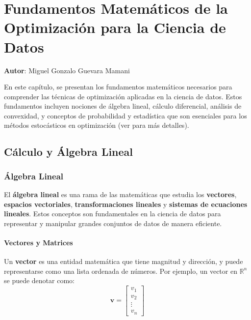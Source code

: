 \documentclass[12pt,a4,oneside]{book}
\begin{document}
	
	\chapter{Fundamentos Matemáticos de la Optimización para la Ciencia de Datos}
	\textbf{Autor}: \large{Miguel Gonzalo Guevara Mamani}
	\label{chap:1}
	
	\vspace{1em}
	
	En este capítulo, se presentan los fundamentos matemáticos necesarios para comprender las técnicas de optimización aplicadas en la ciencia de datos. Estos fundamentos incluyen nociones de álgebra lineal, cálculo diferencial, análisis de convexidad, y conceptos de probabilidad y estadística que son esenciales para los métodos estocásticos en optimización (ver \cite{kirkland2021, garcia2022, smith2023, williams2024} para más detalles).
	
	\section{Cálculo y Álgebra Lineal}
	
	\subsection{Álgebra Lineal}
	
	El \textbf{álgebra lineal} es una rama de las matemáticas que estudia los \textbf{vectores}, \textbf{espacios vectoriales}, \textbf{transformaciones lineales} y \textbf{sistemas de ecuaciones lineales}. Estos conceptos son fundamentales en la ciencia de datos para representar y manipular grandes conjuntos de datos de manera eficiente.
	
	\subsubsection{Vectores y Matrices}
	
	Un \textbf{vector} es una entidad matemática que tiene magnitud y dirección, y puede representarse como una lista ordenada de números. Por ejemplo, un vector en \(\mathbb{R}^n\) se puede denotar como:
	\[
	\mathbf{v} = \begin{bmatrix} v_1 \\ v_2 \\ \vdots \\ v_n \end{bmatrix}
	\]
	
\end{document}
